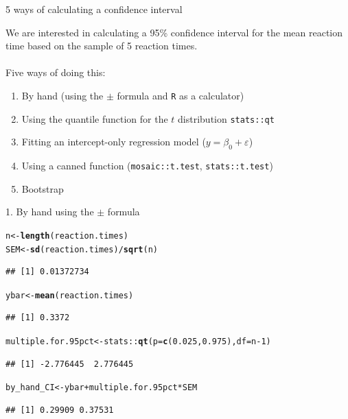 \documentclass[10pt,handout]{beamer}\usepackage[]{graphicx}\usepackage[]{color}
\makeatletter
\newcommand{\hlnum}[1]{\textcolor[rgb]{0.686,0.059,0.569}{#1}}%
\newcommand{\hlopt}[1]{\textcolor[rgb]{0,0,0}{#1}}%
\newcommand{\hlstd}[1]{\textcolor[rgb]{0.345,0.345,0.345}{#1}}%
\newcommand{\hlkwb}[1]{\textcolor[rgb]{0.69,0.353,0.396}{#1}}%
\newcommand{\hlkwc}[1]{\textcolor[rgb]{0.333,0.667,0.333}{#1}}%
\newcommand{\hlkwd}[1]{\textcolor[rgb]{0.737,0.353,0.396}{\textbf{#1}}}%
\newenvironment{kframe}{%
 \def\at@end@of@kframe{}%
 \ifinner\ifhmode%
  \def\at@end@of@kframe{\end{minipage}}%
  \begin{minipage}{\columnwidth}%
 \fi\fi%
 \def\FrameCommand##1{\hskip\@totalleftmargin \hskip-\fboxsep
 \colorbox{shadecolor}{##1}\hskip-\fboxsep
     \hskip-\linewidth \hskip-\@totalleftmargin \hskip\columnwidth}%
 \MakeFramed {\advance\hsize-\width
   \@totalleftmargin\z@ \linewidth\hsize
   \@setminipage}}%
 {\par\unskip\endMakeFramed%
 \at@end@of@kframe}
\newenvironment{knitrout}{}{} %
\makeatother
\begin{document}
\begin{frame}[fragile]{5 ways of calculating a confidence interval}
	
	We are interested in calculating a 95\% confidence interval for the mean reaction time based on the sample of 5 reaction times. \\ \ \\
	\pause
	Five ways of doing this:
	\begin{enumerate}
		\setlength\itemsep{1em}
		\item By hand (using the $\pm$ formula and \texttt{R} as a calculator)
		\item Using the quantile function for the $t$ distribution \texttt{stats::qt}
		\item Fitting an intercept-only regression model ($y = \beta_0 + \varepsilon$)
		\item Using a canned function (\texttt{mosaic::t.test}, \texttt{stats::t.test})
		\item Bootstrap
	\end{enumerate}
	
\end{frame}

\begin{frame}[fragile]{1. By hand using the $\pm$ formula}
\begin{knitrout}\tiny
{}\color{fgcolor}\begin{kframe}
\begin{alltt}
\hlstd{n} \hlkwb{<-} \hlkwd{length}\hlstd{(reaction.times)}
\hlstd{SEM} \hlkwb{<-} \hlkwd{sd}\hlstd{(reaction.times)}\hlopt{/}\hlkwd{sqrt}\hlstd{(n)}
\end{alltt}
\begin{verbatim}
## [1] 0.01372734
\end{verbatim}
\begin{alltt}
\hlstd{ybar} \hlkwb{<-} \hlkwd{mean}\hlstd{(reaction.times)}
\end{alltt}
\begin{verbatim}
## [1] 0.3372
\end{verbatim}
\begin{alltt}
\hlstd{multiple.for.95pct} \hlkwb{<-} \hlstd{stats}\hlopt{::}\hlkwd{qt}\hlstd{(}\hlkwc{p} \hlstd{=} \hlkwd{c}\hlstd{(}\hlnum{0.025}\hlstd{,} \hlnum{0.975}\hlstd{),} \hlkwc{df} \hlstd{= n}\hlopt{-}\hlnum{1}\hlstd{)}
\end{alltt}
\begin{verbatim}
## [1] -2.776445  2.776445
\end{verbatim}
\begin{alltt}
\hlstd{by_hand_CI} \hlkwb{<-} \hlstd{ybar} \hlopt{+} \hlstd{multiple.for.95pct} \hlopt{*} \hlstd{SEM}
\end{alltt}
\begin{verbatim}
## [1] 0.29909 0.37531
\end{verbatim}
\end{kframe}
\end{knitrout}
\end{frame}
\end{document}
